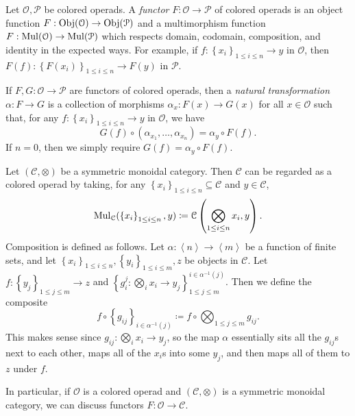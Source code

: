 \begin{definition}\label{1.2.3}
	Let $\mathcal{O} ,\mathcal{P} $ be colored operads. A \emph{functor} $F : \mathcal{O}  \to \mathcal{P} $ of colored operads is an object function $F : \operatorname{Obj}(\mathcal{O})  \to \operatorname{Obj}(\mathcal{P} ) $ and a multimorphism function $F : \operatorname{Mul}(\mathcal{O} ) \to \operatorname{Mul}(\mathcal{P} )$ which respects domain, codomain, composition, and identity in the expected ways. For example, if $f : \left\{ x_i \right\}_{1\leq i\leq n}  \to y$ in $\mathcal{O} $, then $F(f): \left\{ F(x_i) \right\}_{1\leq i\leq n}  \to F(y)$ in $\mathcal{P} $.

	If $F,G : \mathcal{O}  \to \mathcal{P} $ are functors of colored operads, then a \emph{natural transformation} $\alpha : F \to G$ is a collection of morphisms $\alpha_{x } : F(x)\to G(x)$ for all $ x\in\mathcal{O} $ such that, for any $f : \left\{ x_i \right\}_{1\leq i\leq n}  \to y$ in $\mathcal{O} $, we have
	\[
		G(f)\circ (\alpha_{x_1} , \ldots , \alpha _{x_n} ) = \alpha_y \circ F(f)
	.\]
	If $n=0$, then we simply require $G(f)=\alpha _y \circ F(f)$.
\end{definition}


\begin{remark}\label{1.2.4}
	Let $(\mathcal{C} ,\otimes )$ be a symmetric monoidal category. Then $\mathcal{C} $ can be regarded as a colored operad by taking, for any $\left\{ x_i \right\} _{1\leq i\leq n} \subseteq \mathcal{C} $ and $y\in \mathcal{C} $,
	\[
		\operatorname{Mul}_\mathcal{C} (\left\{ x_i \right\} _{1\leq i\leq n} ,y)\coloneqq \mathcal{C} \left(\bigotimes_{1\leq i\leq n} x_i,y\right)
	.\]
	Composition is defined as follows. Let $\alpha  : \left\langle n \right\rangle  \to \left\langle m \right\rangle $ be a function of finite sets, and let $\left\{ x_i \right\} _{1\leq i\leq n} ,\left\{ y_i \right\} _{1\leq i\leq m} ,z$ be objects in $\mathcal{C} $. Let $f : \left\{ y_j \right\}_{1\leq j\leq m}  \to z$ and $\left\{ g_i^j : \bigotimes_{i} x_i \to y_j \right\}_{1\leq j\leq m}^{i\in \alpha ^{-1} (j)}  $. Then we define the composite
	\[
		f \circ \left\{ g_{ij} \right\}_{i\in \alpha ^{-1} (j)} \coloneqq f\circ \bigotimes_{1\leq j\leq m}  g_{ij}
	.\]
	This makes sense since $g_{ij} : \bigotimes_i x_i \to y_j$, so the map $\alpha $ essentially sits all the $g_{ij} $s next to each other, maps all of the $x_i$s into some $y_j$, and then maps all of them to $z$ under $f$.

	In particular, if $\mathcal{O} $ is a colored operad and $(\mathcal{C},\otimes ) $ is a symmetric monoidal category, we can discuss functors $F : \mathcal{O}  \to \mathcal{C} $.
\end{remark}


